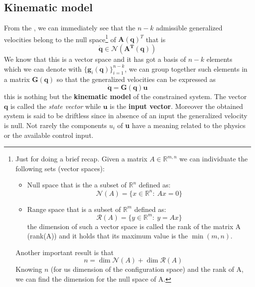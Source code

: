 \subsection{Kinematic model}
From the , we can immediately see that the $n-k$ admissible generalized velocities belong to the null space\footnote{
    Just for doing a brief recap. Given a matrix $A\in\mathbb{R}^{m,n}$ we can individuate the following sets (vector spaces):
    \begin{itemize}
        \itemsep-0.3em
        \item \textsf{Null space} that is the a subset of $\mathbb{R}^n$ defined as: 
        \begin{equation}
            \mathcal{N}(A)=\{x\in\mathbb{R}^n: \ Ax=0\}
        \end{equation}
        \item \textsf{Range space} that is a subset of $\mathbb{R}^m$ defined as: 
        \begin{equation}
            \mathcal{R}(A)=\{y\in\mathbb{R}^m: \ y=Ax\}
        \end{equation}
        the dimension of such a vector space is called the rank of the matrix A (rank(A)) and it holds that its maximum value is the $\min(m,n)$.
    \end{itemize}
    Another important result is that
    \begin{equation*}
        n=\dim{\mathcal{N}(A)}+\dim{\mathcal{R}}(A)
    \end{equation*}
    Knowing $n$ (for us dimension of the configuration space)
 and the rank of A, we can find the dimension for the null space of A.} of $\mathbf{A(q)}^T$ that is 
\begin{equation}
    \dot{\mathbf{q}} \in \mathcal{N}(\mathbf{A^T(q)})
\end{equation}
We know that this is a vector space and it has got a basis of $n-k$ elements which we can denote with $\{\mathbf{g}_i(\mathbf{q})\}_{i=1}^{n-k}$, we can group together such elements in a matrix $\mathbf{G(q)}$ so that the generalized velocities can be expressed as
\begin{equation}
    \mathbf{\dot{q}=G(q)u}
\end{equation}
this is nothing but the \textbf{kinematic model} of the constrained system. The vector $\mathbf{q}$ is called the \emph{state vector} while $\mathbf{u}$ is the \textbf{input vector}. Moreover the obtained system is said to be driftless since in absence of an input the generalized velocity is null. Not rarely the components $u_i$ of \textbf{u} have a meaning related to the physics or the available control input.\\

